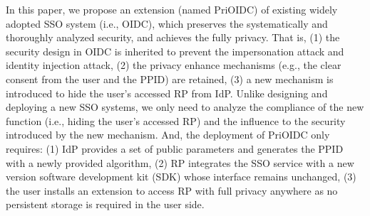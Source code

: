 
 

In this paper, we propose an extension (named PriOIDC) of existing widely adopted SSO system (i.e., OIDC), which preserves the systematically and thoroughly analyzed security, and achieves the fully privacy. That is, (1) the security design in OIDC is inherited to prevent the impersonation attack and  identity injection attack, (2) the privacy enhance mechanisms (e.g., the clear consent from the user and the PPID) are retained, (3) a new mechanism is introduced to hide the user's accessed RP from IdP. Unlike designing and deploying a new SSO systems, we only need to analyze the compliance of the new function (i.e., hiding the user's accessed RP) and the influence to the security introduced by the new mechanism. And, the deployment of PriOIDC only requires: (1) IdP provides a set of public parameters and generates the PPID with a newly provided algorithm, (2) RP integrates the SSO service with a new version software development kit (SDK) whose interface remains unchanged, (3) the user installs an extension to access RP with full privacy anywhere as no persistent storage is required in the user side.

